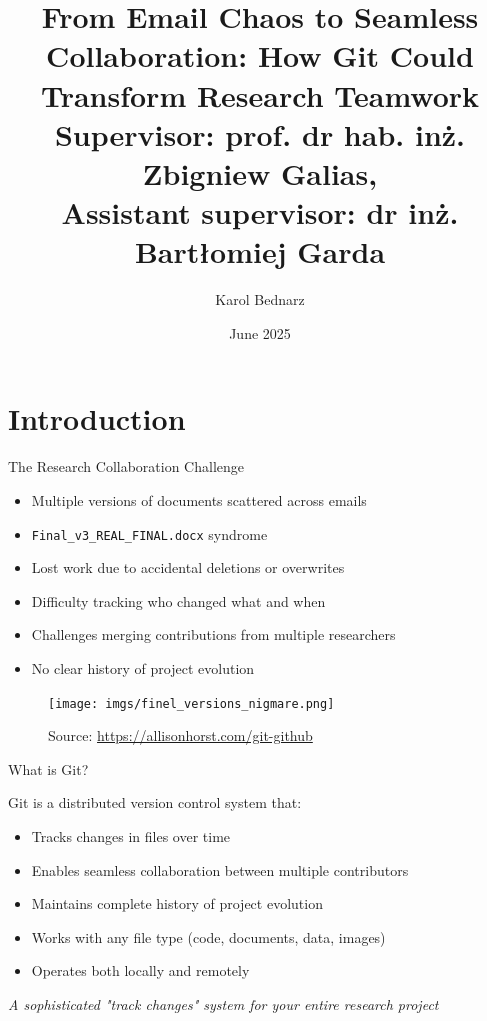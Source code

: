 \documentclass[aspectratio=1609]{beamer}
\title{From Email Chaos to Seamless Collaboration: How Git Could Transform Research Teamwork\\
\small Supervisor: prof. dr hab. inż. Zbigniew Galias, \\
Assistant supervisor: dr inż. Bartłomiej Garda
}
\date{June 2025}
\author{Karol Bednarz}
\begin{document}
\begin{frame}
\titlepage
\end{frame}


\section{Introduction}
\begin{frame}[fragile]{The Research Collaboration Challenge}
    \begin{tblock}{}
        \begin{itemize}
            \item Multiple versions of documents scattered across emails
            \item \verb|Final_v3_REAL_FINAL.docx| syndrome
            \item Lost work due to accidental deletions or overwrites
            \item Difficulty tracking who changed what and when
            \item Challenges merging contributions from multiple researchers
            \item No clear history of project evolution
        \end{itemize}
    \end{tblock}
\end{frame}

\begin{frame}
    \begin{figure}
        \texttt{[image: imgs/finel\_versions\_nigmare.png]}
        \caption{Source: \url{https://allisonhorst.com/git-github}}
    \end{figure}
\end{frame}



\begin{frame}{What is Git?}
    \begin{tblock}{Git is a distributed version control system that:}
        \begin{itemize}
            \item Tracks changes in files over time
            \item Enables seamless collaboration between multiple contributors
            \item Maintains complete history of project evolution
            \item Works with any file type (code, documents, data, images)
            \item Operates both locally and remotely
        \end{itemize}
    \end{tblock}
    \begin{talert}{}
        \emph{A sophisticated "track changes" system for your entire research project}
    \end{talert}
\end{frame}
\end{document}
